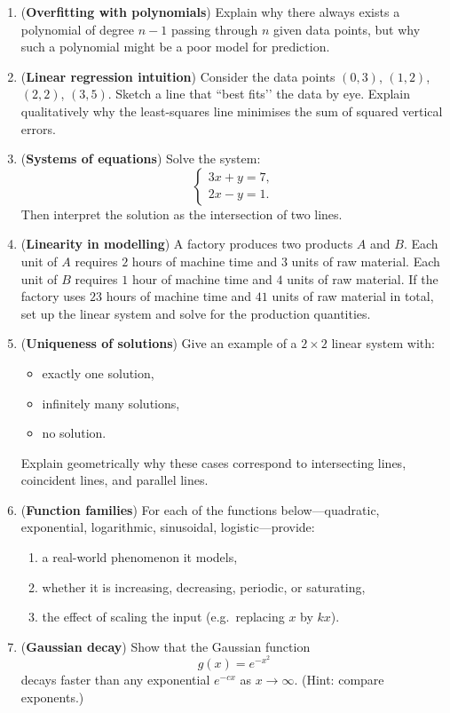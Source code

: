 \begin{enumerate}
\item (\textbf{Overfitting with polynomials})
Explain why there always exists a polynomial of degree $n-1$
passing through $n$ given data points,
but why such a polynomial might be a poor model for prediction.

\item (\textbf{Linear regression intuition})
Consider the data points $(0,3)$, $(1,2)$, $(2,2)$, $(3,5)$.
Sketch a line that “best fits’’ the data by eye.
Explain qualitatively why the least-squares line minimises the sum of squared vertical errors.

\item (\textbf{Systems of equations})
Solve the system:
\[
\begin{cases}
3x + y = 7,\\
2x - y = 1.
\end{cases}
\]
Then interpret the solution as the intersection of two lines.

\item (\textbf{Linearity in modelling})
A factory produces two products $A$ and $B$.
Each unit of $A$ requires $2$ hours of machine time and $3$ units of raw material.
Each unit of $B$ requires $1$ hour of machine time and $4$ units of raw material.
If the factory uses $23$ hours of machine time and $41$ units of raw material in total,
set up the linear system and solve for the production quantities.

\item (\textbf{Uniqueness of solutions})
Give an example of a $2\times 2$ linear system with:
\begin{itemize}
    \item exactly one solution,
    \item infinitely many solutions,
    \item no solution.
\end{itemize}
Explain geometrically why these cases correspond to
intersecting lines, coincident lines, and parallel lines.

\item (\textbf{Function families})
For each of the functions below—quadratic, exponential, logarithmic,
sinusoidal, logistic—provide:
\begin{enumerate}
    \item a real-world phenomenon it models,
    \item whether it is increasing, decreasing, periodic, or saturating,
    \item the effect of scaling the input (e.g.\ replacing $x$ by $kx$).
\end{enumerate}

\item (\textbf{Gaussian decay})
Show that the Gaussian function
\[
g(x)=e^{-x^2}
\]
decays faster than any exponential $e^{-c x}$ as $x\to\infty$.
(Hint: compare exponents.)

\end{enumerate}
